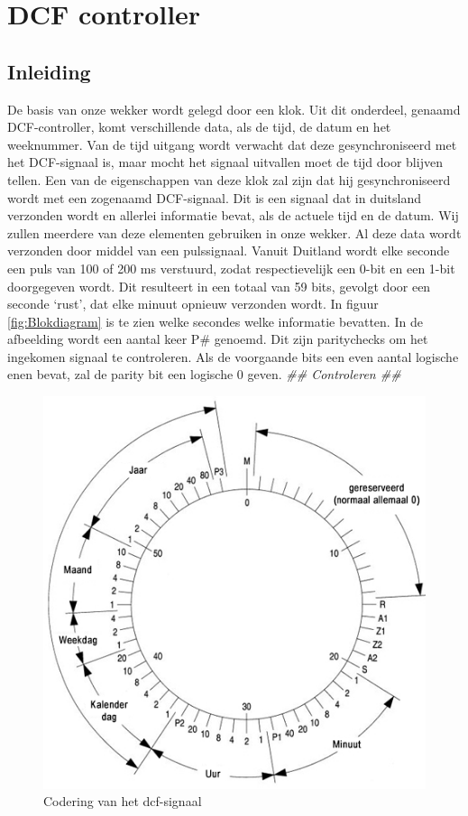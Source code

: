 \chapter{DCF controller}
\section{Inleiding}
De basis van onze wekker wordt gelegd door een klok. Uit dit onderdeel, genaamd DCF-controller,  komt verschillende data, als de tijd, de datum en het weeknummer. Van de tijd uitgang wordt verwacht dat deze gesynchroniseerd met het DCF-signaal is, maar mocht het signaal uitvallen moet de tijd door blijven tellen.
Een van de eigenschappen van deze klok zal zijn dat hij gesynchroniseerd wordt met een zogenaamd DCF-signaal. Dit is een signaal dat in duitsland verzonden wordt en allerlei informatie bevat, als de actuele tijd en de datum. Wij zullen meerdere van deze elementen gebruiken in onze wekker.  Al deze data wordt verzonden door middel van een pulssignaal. Vanuit Duitland wordt elke seconde een puls van 100 of 200 ms verstuurd, zodat respectievelijk een 0-bit en een 1-bit doorgegeven wordt. Dit resulteert in een totaal van 59 bits, gevolgt door een seconde ‘rust’, dat elke minuut opnieuw verzonden wordt. In figuur \ref{fig:Blokdiagram} is te zien welke secondes welke informatie bevatten. In de afbeelding wordt een aantal keer P\# genoemd. Dit zijn paritychecks om het ingekomen signaal te controleren. Als de voorgaande bits een even aantal logische enen bevat, zal de parity bit een logische 0 geven. \emph{\color{red} \#\# Controleren \#\#}

\begin{figure}[h!]
\center
\includegraphics[scale=2]{Figuren/DCF77/dcf77coding.png}
\caption{Codering van het dcf-signaal}
\label{fig:dcfsignaal}
\end{figure}

